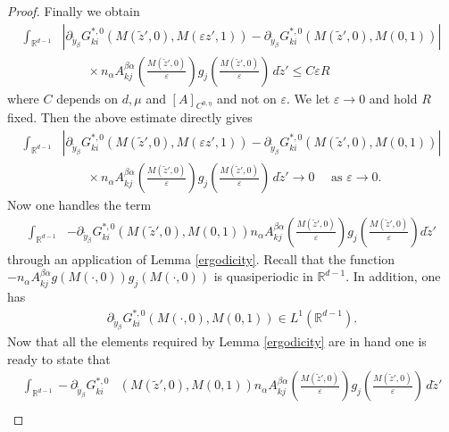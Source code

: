 \documentclass[11pt, reqno]{amsart}
\theoremstyle{definition}
\theoremstyle{remark}
\numberwithin{equation}{section}
\begin{document}
\begin{proof}[Proof]
		\noindent Finally we obtain 
		\begin{align*}
			\int_{{\mathbb{R}}^{d-1}}&	\left| \partial_{\tilde{y}_\beta} G^{*,0}_{ki}\left(M(\tilde{z}',0),M (\varepsilon z',1) \right)
			-\partial_{\tilde{y}_\beta} G^{*,0}_{ki}(M(\tilde{z}',0),M (0,1) )  \right| \\
			&\qquad \times n_\alpha A^{\beta\alpha}_{kj} \left(\frac{M(\tilde{z}',0)}{\varepsilon }\right) g_j\left(\frac{M(\tilde{z}',0)}{\varepsilon }\right)  \,d\tilde{z}' 	\leq C\varepsilon R
		\end{align*}	where $C$ depends on $d,\mu$ and $[A]_{C^{0,\eta}}$ and not on $\varepsilon$.	We let $\varepsilon\rightarrow 0$ and hold $R$ fixed. Then the above estimate directly gives
		\begin{align}\label{conv01}
			\int_{{\mathbb{R}}^{d-1}}&	\left| \partial_{\tilde{y}_\beta} G^{*,0}_{ki} \left(M(\tilde{z}',0),M (\varepsilon z',1) \right)
			-\partial_{\tilde{y}_\beta} G^{*,0}_{ki}(M(\tilde{z}',0),M (0,1) )  \right| \nonumber\\
			&\qquad \times n_\alpha A^{\beta\alpha}_{kj} \left(\frac{M(\tilde{z}',0)}{\varepsilon }\right) g_j\left(\frac{M(\tilde{z}',0)}{\varepsilon }\right)  \,d\tilde{z}' 	\longrightarrow 0\quad \mbox{ as } \varepsilon \rightarrow 0.
		\end{align}	
		Now one handles the term 
		\begin{align*}
			\int_{\mathbb{R}^{d-1}} &-\partial_{\tilde{y}_\beta} G^{*,0}_{ki} \left(M(\tilde{z}',0),M (0,1) \right)  n_\alpha A^{\beta\alpha}_{kj}\left(\frac{M(\tilde{z}',0)}{\varepsilon }\right) g_j\left(\frac{M(\tilde{z}',0)}{\varepsilon }\right) d\tilde{z}'
		\end{align*}
		through an application of Lemma \ref{ergodicity}. Recall that the function  $- n_\alpha A^{\beta\alpha}_{kj}g(M(\cdot,0))g_j(M(\cdot,0))$ is  quasiperiodic in $\mathbb{R}^{d-1}$.   In addition, one has  
		\begin{align*}
			\partial_{\tilde{y}_\beta} G^{*,0}_{ki}\left(M(\cdot,0),M (0,1) \right) \in L^1(\mathbb{R}^{d-1}).
		\end{align*}
		Now that all the elements required by Lemma \ref{ergodicity} are in hand one is ready to state that  
		\begin{align}
			\int_{\mathbb{R}^{d-1}}- \partial_{\tilde{y}_\beta} G^{*,0}_{ki}&\left(M(\tilde{z}',0),M (0,1) \right)  n_\alpha A^{\beta\alpha}_{kj}\left(\frac{M(\tilde{z}',0)}{\varepsilon }\right) g_j\left(\frac{M(\tilde{z}',0)}{\varepsilon }\right)\,d\tilde{z}' \nonumber\\

\end{align}
\end{proof}
\end{document}
